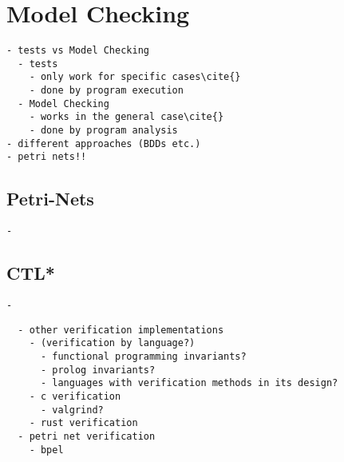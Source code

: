 \section{Model Checking}
\label{rel_mc}
\begin{verbatim}
- tests vs Model Checking
  - tests 
    - only work for specific cases\cite{}
    - done by program execution
  - Model Checking 
    - works in the general case\cite{}
    - done by program analysis
- different approaches (BDDs etc.)
- petri nets!!
\end{verbatim}

\subsection{Petri-Nets}
\label{rel_petri}
\begin{verbatim}
- 
\end{verbatim}

\subsection{CTL*}
\label{rel_ctl}
\begin{verbatim}
- 
\end{verbatim}


\begin{verbatim}
  - other verification implementations
    - (verification by language?)
      - functional programming invariants?
      - prolog invariants?
      - languages with verification methods in its design?
    - c verification
      - valgrind?
    - rust verification
  - petri net verification
    - bpel
\end{verbatim}